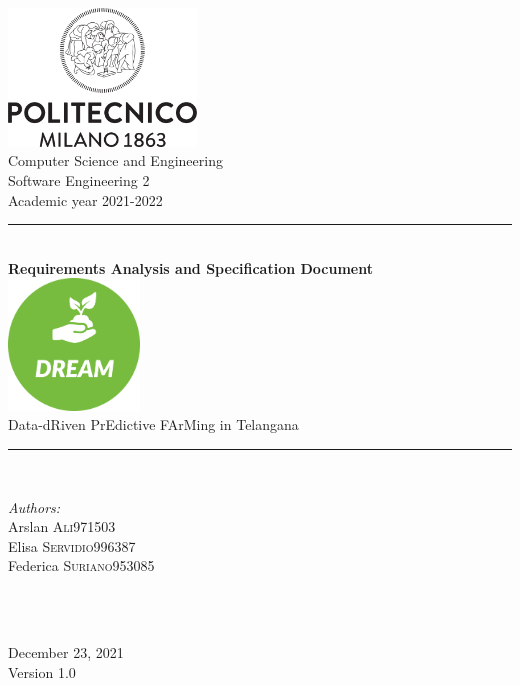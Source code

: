 \documentclass[a4paper,11pt]{report}
\begin{document}
\begin{titlepage}

\newcommand{\HRule}{\rule{\linewidth}{0.1mm}}

\center 

\includegraphics[width=50mm,scale=0.5]{./Images/Logo_Politecnico_Milano.png}\\[0.5cm] 

{\Large Computer Science and Engineering}\\[0.4cm] 
{\large Software Engineering 2}\\[0.4cm] 
{\large Academic year 2021-2022}\\[0.5cm] 

\HRule \\[1 cm]
{\LARGE \textbf{Requirements Analysis and Specification Document}} \\[0.7cm]
\includegraphics[width=35mm,scale=0.5]{./Images/Mocks/Logo/DREAM logo.png}\\[0.5cm] 
{\LARGE Data-dRiven PrEdictive FArMing in Telangana} \\[0.7cm]
\HRule \\[1cm]
\raggedright

\begin{minipage}{0.55\textwidth}
\begin{flushleft} \large
\emph{Authors:}\\
Arslan \textsc{Ali}\hfill 971503 \\
Elisa \textsc{Servidio}\hfill 996387 \\
Federica \textsc{Suriano}\hfill 953085 \\
\end{flushleft}
\end{minipage}\\[0.7 cm]
~

\center

{\large December 23, 2021}\\[0.3 cm]
{\large Version 1.0}\\

\vfill 
\end{titlepage}
\end{document}

